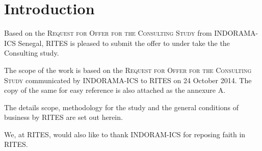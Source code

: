 \section{Introduction}

Based on the \textsc{Request for Offer for the Consulting Study} from INDORAMA-ICS Senegal, RITES is pleased to submit the offer to under take the the Consulting study.

\vskip 1cm

The scope of the work is based on the \textsc{Request for Offer for the Consulting Study} communicated by INDORAMA-ICS to RITES on 24 October 2014.
The copy of the same for easy reference is also attached as the annexure A.

\vskip 1cm

The details scope, methodology for the study and the general conditions of business by RITES are  set out herein.

\vskip 1cm

We, at RITES,  would also like to thank INDORAM-ICS for reposing faith in RITES.